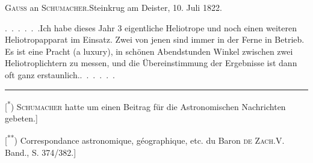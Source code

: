 \par\bigskip
\begin{center}{\large\textsc{Gauss} an \textsc{Schumacher}.\quad Steinkrug am Deister, 10. Juli 1822.}\end{center}
\par\noindent\hspace*{\parindent}.\ .\ .\ .\ .\ .\enspace Ich habe dieses Jahr 3 eigentliche Heliotrope und noch einen weiteren Heliotropapparat im Einsatz. Zwei von jenen sind immer in der Ferne in Betrieb. Es ist eine Pracht (a luxury), in schönen Abendstunden Winkel zwischen zwei Heliotroplichtern zu messen, und die Übereinstimmung der Ergebnisse ist dann oft ganz erstaunlich.\enspace .\ .\ .\ .\ .\ .
\par\medskip\noindent\rule{4cm}{.4pt}\par
\begingroup\footnotesize
\noindent\hspace*{\parindent}[\textsuperscript{*}) \textsc{Schumacher} hatte um einen Beitrag für die Astronomischen Nachrichten gebeten.]\par
\noindent\hspace*{\parindent}[\textsuperscript{**}) Correspondance astronomique, géographique, etc. du Baron \textsc{de Zach}.\quad V. Band., S. 374/382.]\par
\endgroup

